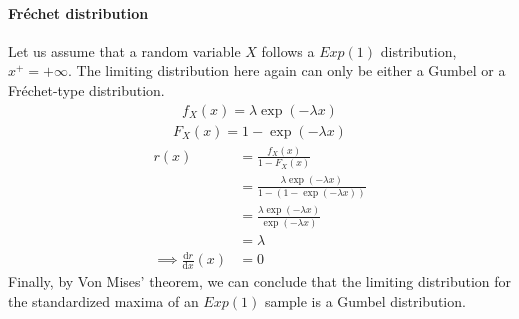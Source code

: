 \paragraph{Fréchet distribution}
Let us assume that a random variable $X$ follows a $Exp(1)$ distribution, $x^+ = + \infty$. The limiting distribution here again can only be either a Gumbel or a Fréchet-type distribution.
\begin{equation}
\begin{alignat*}{2}
f_X(x) = \lambda \exp(- \lambda x)
\end{alignat*}
\end{equation}
\begin{equation}
\begin{alignat*}{2}
F_X(x) =  1 - \exp(- \lambda x)
\end{alignat*}
\end{equation}
\begin{equation}
\begin{alignat*}{2}
r(x) &= \frac{f_X(x)}{1 - F_X(x)} \\
&= \frac{\lambda \exp(- \lambda x)}{1 - (1 - \exp(- \lambda x))} \\
&= \frac{\lambda \exp(- \lambda x)}{\exp(- \lambda x)} \\
&= \lambda \\
\implies \frac{\mathrm{d}r}{\mathrm{d}x}(x) &= 0
\end{alignat*}
\end{equation}
Finally, by Von Mises' theorem, we can conclude that the limiting distribution for the standardized maxima of an $Exp(1)$ sample is a Gumbel distribution.
